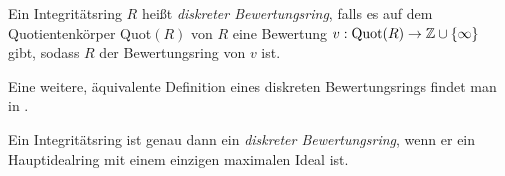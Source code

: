 %
% 
%
\begin{defn}   %
Ein Integritätsring $R$ heißt \textit{diskreter Bewertungsring}, falls es auf dem Quotientenkörper \textup{Quot}$(R)$ von $R$ eine Bewertung $v: \textup{Quot}(R) \rightarrow \mathbb{Z} \cup \lbrace\infty\rbrace$ gibt, sodass $R$
der Bewertungsring von $v$ ist.
\end{defn}
Eine weitere, äquivalente Definition eines diskreten Bewertungsrings findet man in \cite[S. 126]{neukirch92}.
\begin{bem} \label{bewertungsring}%
Ein Integritätsring ist genau dann ein \textit{diskreter Bewertungsring}, wenn er ein Hauptidealring mit einem einzigen maximalen Ideal ist.
\end{bem} 
